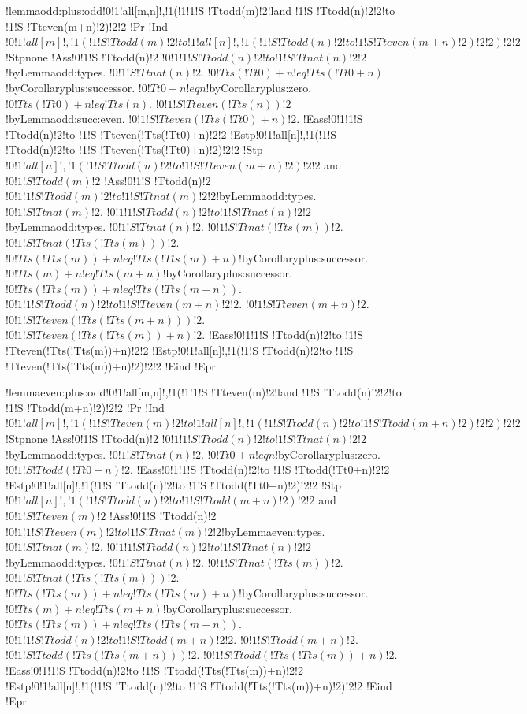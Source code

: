 !lemma{odd:plus:odd}{!0!1!all[m,n]!,!1(!1!1!S !Tt{odd}(m)!2!land !1!S !Tt{odd}(n)!2!2!to !1!S !Tt{even}(m+n)!2)!2!2}
!Pr{
!Ind{$!0!1!all[m]!,!1(!1!S !Tt{odd}(m)!2!to !1!all[n]!,!1(!1!S !Tt{odd}(n)!2!to !1!S !Tt{even}(m+n)!2)!2!2)!2!2$}
!Stp{none}
!Ass{!0!1!S !Tt{odd}(n)!2}
$!0!1!1!S !Tt{odd}(n)!2!to !1!S !Tt{nat}(n)!2!2$!by{Lemma}{odd:types}.
$!0!1!S !Tt{nat}(n)!2$.
$!0!Tt{s}(!Tt{0})+n !eq !Tt{s}(!Tt{0}+n)$!by{Corollary}{plus:successor}.
$!0!Tt{0}+n !eq n$!by{Corollary}{plus:zero}.
$!0!Tt{s}(!Tt{0})+n !eq !Tt{s}(n)$.
$!0!1!S !Tt{even}(!Tt{s}(n))!2$!by{Lemma}{odd:succ:even}.
$!0!1!S !Tt{even}(!Tt{s}(!Tt{0})+n)!2$.
!Eass{!0!1!1!S !Tt{odd}(n)!2!to !1!S !Tt{even}(!Tt{s}(!Tt{0})+n)!2!2}
!Estp{!0!1!all[n]!,!1(!1!S !Tt{odd}(n)!2!to !1!S !Tt{even}(!Tt{s}(!Tt{0})+n)!2)!2!2}
!Stp{$!0!1!all[n]!,!1(!1!S !Tt{odd}(n)!2!to !1!S !Tt{even}(m+n)!2)!2!2$ and $!0!1!S !Tt{odd}(m)!2$}
!Ass{!0!1!S !Tt{odd}(n)!2}
$!0!1!1!S !Tt{odd}(m)!2!to !1!S !Tt{nat}(m)!2!2$!by{Lemma}{odd:types}.
$!0!1!S !Tt{nat}(m)!2$.
$!0!1!1!S !Tt{odd}(n)!2!to !1!S !Tt{nat}(n)!2!2$!by{Lemma}{odd:types}.
$!0!1!S !Tt{nat}(n)!2$.
$!0!1!S !Tt{nat}(!Tt{s}(m))!2$.
$!0!1!S !Tt{nat}(!Tt{s}(!Tt{s}(m)))!2$.
$!0!Tt{s}(!Tt{s}(m))+n !eq !Tt{s}(!Tt{s}(m)+n)$!by{Corollary}{plus:successor}.
$!0!Tt{s}(m)+n !eq !Tt{s}(m+n)$!by{Corollary}{plus:successor}.
$!0!Tt{s}(!Tt{s}(m))+n !eq !Tt{s}(!Tt{s}(m+n))$.
$!0!1!1!S !Tt{odd}(n)!2!to !1!S !Tt{even}(m+n)!2!2$.
$!0!1!S !Tt{even}(m+n)!2$.
$!0!1!S !Tt{even}(!Tt{s}(!Tt{s}(m+n)))!2$.
$!0!1!S !Tt{even}(!Tt{s}(!Tt{s}(m))+n)!2$.
!Eass{!0!1!1!S !Tt{odd}(n)!2!to !1!S !Tt{even}(!Tt{s}(!Tt{s}(m))+n)!2!2}
!Estp{!0!1!all[n]!,!1(!1!S !Tt{odd}(n)!2!to !1!S !Tt{even}(!Tt{s}(!Tt{s}(m))+n)!2)!2!2}
!Eind}
!Epr

!lemma{even:plus:odd}{!0!1!all[m,n]!,!1(!1!1!S !Tt{even}(m)!2!land !1!S !Tt{odd}(n)!2!2!to !1!S !Tt{odd}(m+n)!2)!2!2}
!Pr{
!Ind{$!0!1!all[m]!,!1(!1!S !Tt{even}(m)!2!to !1!all[n]!,!1(!1!S !Tt{odd}(n)!2!to !1!S !Tt{odd}(m+n)!2)!2!2)!2!2$}
!Stp{none}
!Ass{!0!1!S !Tt{odd}(n)!2}
$!0!1!1!S !Tt{odd}(n)!2!to !1!S !Tt{nat}(n)!2!2$!by{Lemma}{odd:types}.
$!0!1!S !Tt{nat}(n)!2$.
$!0!Tt{0}+n !eq n$!by{Corollary}{plus:zero}.
$!0!1!S !Tt{odd}(!Tt{0}+n)!2$.
!Eass{!0!1!1!S !Tt{odd}(n)!2!to !1!S !Tt{odd}(!Tt{0}+n)!2!2}
!Estp{!0!1!all[n]!,!1(!1!S !Tt{odd}(n)!2!to !1!S !Tt{odd}(!Tt{0}+n)!2)!2!2}
!Stp{$!0!1!all[n]!,!1(!1!S !Tt{odd}(n)!2!to !1!S !Tt{odd}(m+n)!2)!2!2$ and $!0!1!S !Tt{even}(m)!2$}
!Ass{!0!1!S !Tt{odd}(n)!2}
$!0!1!1!S !Tt{even}(m)!2!to !1!S !Tt{nat}(m)!2!2$!by{Lemma}{even:types}.
$!0!1!S !Tt{nat}(m)!2$.
$!0!1!1!S !Tt{odd}(n)!2!to !1!S !Tt{nat}(n)!2!2$!by{Lemma}{odd:types}.
$!0!1!S !Tt{nat}(n)!2$.
$!0!1!S !Tt{nat}(!Tt{s}(m))!2$.
$!0!1!S !Tt{nat}(!Tt{s}(!Tt{s}(m)))!2$.
$!0!Tt{s}(!Tt{s}(m))+n !eq !Tt{s}(!Tt{s}(m)+n)$!by{Corollary}{plus:successor}.
$!0!Tt{s}(m)+n !eq !Tt{s}(m+n)$!by{Corollary}{plus:successor}.
$!0!Tt{s}(!Tt{s}(m))+n !eq !Tt{s}(!Tt{s}(m+n))$.
$!0!1!1!S !Tt{odd}(n)!2!to !1!S !Tt{odd}(m+n)!2!2$.
$!0!1!S !Tt{odd}(m+n)!2$.
$!0!1!S !Tt{odd}(!Tt{s}(!Tt{s}(m+n)))!2$.
$!0!1!S !Tt{odd}(!Tt{s}(!Tt{s}(m))+n)!2$.
!Eass{!0!1!1!S !Tt{odd}(n)!2!to !1!S !Tt{odd}(!Tt{s}(!Tt{s}(m))+n)!2!2}
!Estp{!0!1!all[n]!,!1(!1!S !Tt{odd}(n)!2!to !1!S !Tt{odd}(!Tt{s}(!Tt{s}(m))+n)!2)!2!2}
!Eind}
!Epr

